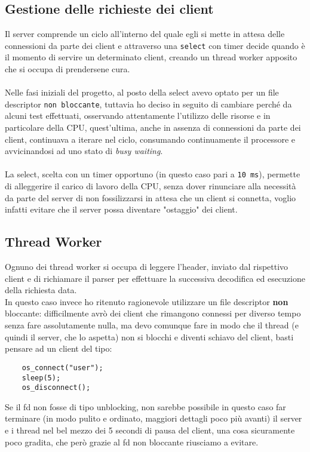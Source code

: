 \subsection{Gestione delle richieste dei client}
\begin{flushleft}
Il server comprende un ciclo all'interno del quale egli si mette in attesa delle connessioni da parte dei client e attraverso una \texttt{select} con timer decide quando è il momento di servire un determinato client, creando un thread worker apposito che si occupa di prendersene cura.
\\~\\
Nelle fasi iniziali del progetto, al posto della select avevo optato per un file descriptor \texttt{non bloccante}, tuttavia ho deciso in seguito di cambiare perché da alcuni test effettuati, osservando attentamente l'utilizzo delle risorse e in particolare della CPU, quest'ultima, anche in assenza di connessioni da parte dei client, continuava a iterare nel ciclo, consumando continuamente il processore e avvicinandosi ad uno stato di \emph{busy waiting}.
\\~\\
La select, scelta con un timer opportuno (in questo caso pari a \texttt{10 ms}), permette di alleggerire il carico di lavoro della CPU, senza dover rinunciare alla necessità da parte del server di non fossilizzarsi in attesa che un client si connetta, voglio infatti evitare che il server possa diventare "ostaggio" dei client.
\end{flushleft}


\vspace{2mm}

\subsection{Thread Worker}
\begin{flushleft}
Ognuno dei thread worker si occupa di leggere l'header, inviato dal rispettivo client e di richiamare il parser per effettuare la successiva decodifica ed esecuzione della richiesta data.\\
In questo caso invece ho ritenuto ragionevole utilizzare un file descriptor \textbf{non} bloccante: difficilmente avrò dei client che rimangono connessi per diverso tempo senza fare assolutamente nulla, ma devo comunque fare in modo che il thread (e quindi il server, che lo aspetta) non si blocchi e diventi schiavo del client, basti pensare ad un client del tipo:

\begin{Verbatim} 
	os_connect("user");
	sleep(5);
	os_disconnect();
\end{Verbatim}

Se il fd non fosse di tipo unblocking, non sarebbe possibile in questo caso far terminare (in modo pulito e ordinato, maggiori dettagli poco più avanti) il server e i thread nel bel mezzo dei 5 secondi di pausa del client, una cosa sicuramente poco gradita, che però grazie al fd non bloccante riusciamo a evitare.

\end{flushleft}

